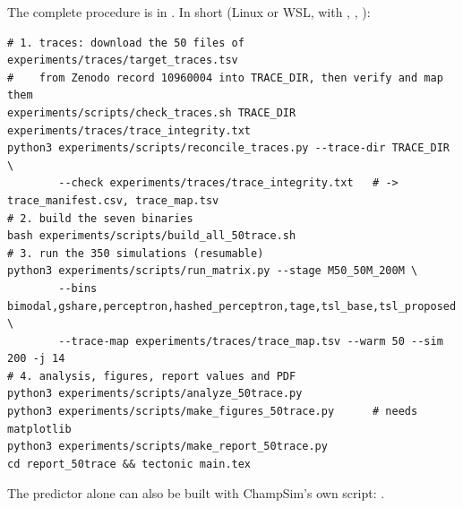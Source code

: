 The complete procedure is in . In short (Linux or WSL, with , , ):
{\footnotesize
\begin{verbatim}
# 1. traces: download the 50 files of experiments/traces/target_traces.tsv
#    from Zenodo record 10960004 into TRACE_DIR, then verify and map them
experiments/scripts/check_traces.sh TRACE_DIR experiments/traces/trace_integrity.txt
python3 experiments/scripts/reconcile_traces.py --trace-dir TRACE_DIR \
        --check experiments/traces/trace_integrity.txt   # -> trace_manifest.csv, trace_map.tsv
# 2. build the seven binaries
bash experiments/scripts/build_all_50trace.sh
# 3. run the 350 simulations (resumable)
python3 experiments/scripts/run_matrix.py --stage M50_50M_200M \
        --bins bimodal,gshare,perceptron,hashed_perceptron,tage,tsl_base,tsl_proposed \
        --trace-map experiments/traces/trace_map.tsv --warm 50 --sim 200 -j 14
# 4. analysis, figures, report values and PDF
python3 experiments/scripts/analyze_50trace.py
python3 experiments/scripts/make_figures_50trace.py      # needs matplotlib
python3 experiments/scripts/make_report_50trace.py
cd report_50trace && tectonic main.tex
\end{verbatim}
}
The predictor alone can also be built with ChampSim's own script: .
